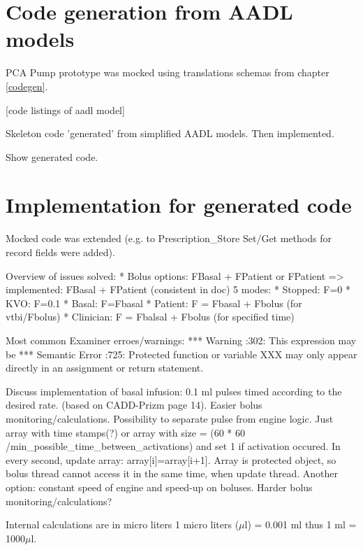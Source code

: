 \section{Code generation from AADL models}

PCA Pump prototype was mocked using translations schemas from chapter \ref{codegen}.

[code listings of aadl model]


Skeleton code 'generated' from simplified AADL models. Then implemented.

Show generated code.



\section{Implementation for generated code}

Mocked code was extended (e.g. to Prescription\_Store Set/Get methods for record fields were added).

Overview of issues solved: 
* Bolus options: FBasal + FPatient or FPatient => implemented: FBasal + FPatient (consistent in doc)
5 modes:
* Stopped: F=0
* KVO: F=0.1
* Basal: F=Fbasal
* Patient: F = Fbasal + Fbolus (for vtbi/Fbolus)
* Clinician: F = Fbalsal + Fbolus (for specified time)

Most common Examiner\cite{Examiner:Online} erroes/warnings:
***        Warning                     :302: This expression may be
***        Semantic Error              :725: Protected function or variable XXX may only appear directly in an assignment or return statement.

Discuss implementation of basal infusion: 0.1 ml pulses timed according to the desired rate. (based on CADD-Prizm page 14). Easier bolus monitoring/calculations. Possibility to separate pulse from engine logic. Just array with time stamps(?) or array with size = (60 * 60 /min\_possible\_time\_between\_activations) and set 1 if activation occured. In every second, update array: array[i]=array[i+1]. Array is protected object, so bolus thread cannot access it in the same time, when update thread.
Another option: constant speed of engine and speed-up on boluses. Harder bolus monitoring/calculations?


Internal calculations are in micro liters 1 micro liters ($\mu$l) = 0.001 ml thus 1 ml = 1000$\mu$l.


